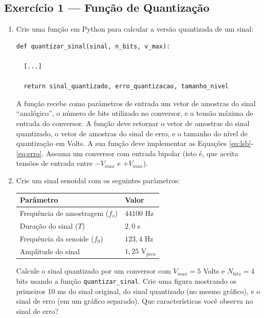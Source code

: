 \documentclass[a4paper,twoside,12pt]{article}
\begin{document}
	\subsection{Exercício 1 — Função de Quantização}
	\label{sec:ex1}
	\begin{enumerate}
		\item Crie uma função em Python para calcular a versão quantizada de um sinal:
		\
\begin{lstlisting}[frame=single]
def quantizar_sinal(sinal, n_bits, v_max):

  [...]
	
  return sinal_quantizado, erro_quantizacao, tamanho_nivel
\end{lstlisting} 
		A função recebe como parâmetros de entrada um vetor de amostras do sinal ``analógico'', o número de bits utilizado no conversor, e a tensão máxima de entrada do conversor. A função deve retornar o vetor de amostras do sinal quantizado, o vetor de amostras do sinal de erro, e o tamanho do nível de quantização em Volts. A sua função deve implementar as Equações \ref{eq:lsb}-\ref{eq:erro}. Assuma um conversor com entrada bipolar (isto é, que aceita tensões de entrada entre $-V_{max}$ e $+V_{max}$). 
		
		\item Crie um sinal senoidal com os seguintes parâmetros:
		\begin{center}
			\begin{tabular}{ll}
				\textbf{Parâmetro} & \textbf{Valor} \\
				\hline
				Frequência de amostragem ($f_s$) & $44100$ Hz \\
				Duração do sinal ($T$)           & $2,0$ s \\
				Frequência da senoide ($f_0$)    & $123,4$ Hz \\
				Amplitude do sinal               & $1,25$ V$_{pico}$ \\
			\end{tabular}
		\end{center}
		
		Calcule o sinal quantizado por um conversor com $V_{max}=5$ Volts e $N_{bits}=4$ bits usando a função {\tt quantizar\_sinal}. Crie uma figura mostrando os primeiros 10 ms do sinal original, do sinal quantizado (no mesmo gráfico), e o sinal de erro (em um gráfico separado). Que características você observa no sinal de erro?
		

\end{enumerate}
\end{document}
